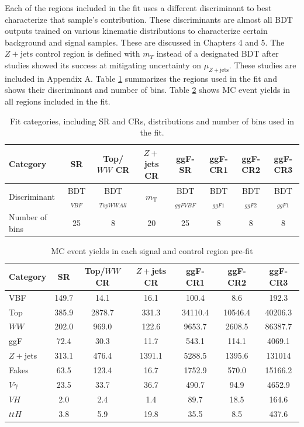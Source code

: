 Each of the regions included in the fit uses a different discriminant to best characterize that sample's contribution. These discriminants are almost all BDT outputs trained on various kinematic distributions to characterize certain background and signal samples. These are discussed in Chapters 4 and 5. The $Z+$jets control region is defined with $m_T$ instead of a designated BDT after studies showed its success at mitigating uncertainty on $\mu_{Z+\text{jets}}$. These studies are included in Appendix A. Table \ref{tab:fitinputs} summarizes the regions used in the fit and shows their discriminant and number of bins. Table \ref{tab:cryields} shows MC event yields in all regions included in the fit. 
\begin{table}[!h]
  \begin{center}
    \begin{tabular}{l|ccccccc}
       Category		& SR 	& Top/$WW$ CR 	& $Z+$jets CR 	& ggF-SR & ggF-CR1 		& ggF-CR2 	& ggF-CR3 \\
      \hline
      Discriminant	& BDT$_{VBF}$ &  BDT$_{TopWWAll}$	& $m_{\text{T}}$ & BDT$_{ggFVBF}$ & BDT$_{ggF1}$	& BDT$_{ggF2}$ & BDT$_{ggF1}$ \\
      Number of bins    &  25 	      & 8 	& 20 		& 25	& 8 			& 8 		& 8  \\	
    \end{tabular}
    \caption{Fit categories, including SR and CRs, distributions and number of bins used in the fit.}
    \label{tab:fitinputs}
  \end{center}
\end{table}

\begin{table}[!h]
  \begin{center}
    \begin{tabular}{l|cccccc}
      Category         & SR    & Top/$WW$ CR   & $Z+$jets CR           & ggF-CR1               & ggF-CR2       & ggF-CR3 \\
      \hline
      VBF      & 149.7 & 14.1 & 16.1 & 100.4 & 8.6 & 192.3 \\
      Top    &  385.9 & 2878.7 & 331.3 & 34110.4 & 10546.4 & 40206.3 \\
      $WW$ & 202.0 & 969.0 & 122.6 & 9653.7 & 2608.5 & 86387.7 \\
      ggF & 72.4 & 30.3 & 11.7 & 543.1 & 114.1 & 4069.1 \\
      $Z+$jets & 313.1 & 476.4 & 1391.1 & 5288.5 & 1395.6 & 131014 \\
      Fakes & 63.5 & 123.4 & 16.7 & 1752.9 & 570.0 & 15166.2 \\
      $V\gamma$ & 23.5 & 33.7 & 36.7 & 490.7 & 94.9 & 4652.9 \\
      $VH$ & 2.0 & 2.4 & 1.4 & 89.7 & 18.5 & 164.6 \\
      $ttH$ &  3.8 &  5.9 &  19.8 & 35.5 & 8.5 & 437.6 \\
      \hline
    \end{tabular}
    \caption{MC event yields in each signal and control region pre-fit}
    \label{tab:cryields}
  \end{center}
\end{table}

